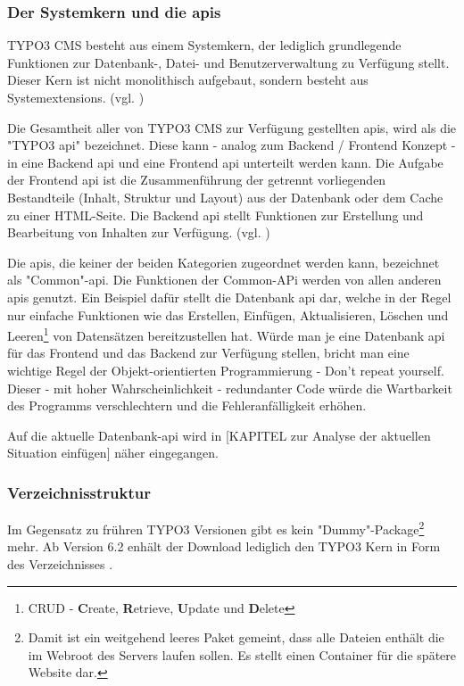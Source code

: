 \subsubsection{Der Systemkern und die \gls{api}s}
TYPO3 CMS besteht aus einem Systemkern, der lediglich grundlegende Funktionen zur Datenbank-, Datei- und Benutzerverwaltung zu Verfügung stellt. Dieser Kern ist nicht monolithisch aufgebaut, sondern besteht aus Systemextensions. (vgl. \cite[S. 32]{book:laborenzTypo32006})

Die Gesamtheit aller von TYPO3 CMS zur Verfügung gestellten \gls{api}s, wird als die "TYPO3 \gls{api}" bezeichnet. Diese kann - analog zum Backend / Frontend Konzept - in eine Backend \gls{api} und eine Frontend \gls{api} unterteilt werden kann. Die Aufgabe der Frontend \gls{api} ist die Zusammenführung der getrennt vorliegenden Bestandteile (Inhalt, Struktur und Layout) aus der Datenbank oder dem Cache zu einer HTML-Seite. Die Backend \gls{api} stellt Funktionen zur Erstellung und Bearbeitung von Inhalten zur Verfügung. (vgl. \cite[S. 5 ff.]{book:dulepovTypo32008})

Die \gls{api}s, die keiner der beiden Kategorien zugeordnet werden kann, bezeichnet \cite[S. 5 ff.]{book:dulepovTypo32008} als "Common"-\gls{api}. Die Funktionen der Common-APi werden von allen anderen \gls{api}s genutzt. Ein Beispiel dafür stellt die Datenbank \gls{api} dar, welche in der Regel nur einfache Funktionen wie das Erstellen, Einfügen, Aktualisieren, Löschen und Leeren\footnote{CRUD - {\bfseries C}reate, {\bfseries R}etrieve, {\bfseries U}pdate und {\bfseries D}elete} von Datensätzen bereitzustellen hat. Würde man je eine Datenbank \gls{api} für das Frontend und das Backend zur Verfügung stellen, bricht man eine wichtige Regel der Objekt-orientierten Programmierung - Don't repeat yourself. Dieser - mit hoher Wahrscheinlichkeit - redundanter Code würde die Wartbarkeit des Programms verschlechtern und die Fehleranfälligkeit erhöhen.

Auf die aktuelle Datenbank-\gls{api} wird in [KAPITEL zur Analyse der aktuellen Situation einfügen] näher eingegangen.

\subsubsection{Verzeichnisstruktur}

Im Gegensatz zu frühren TYPO3 Versionen gibt es kein "Dummy"-Package\footnote{Damit ist ein weitgehend leeres Paket gemeint, dass alle Dateien enthält die im Web\-root des Servers laufen sollen. Es stellt einen Container für die spätere Website dar.} mehr. Ab Version 6.2 enhält der Download lediglich den TYPO3 Kern in Form des Verzeichnisses .

